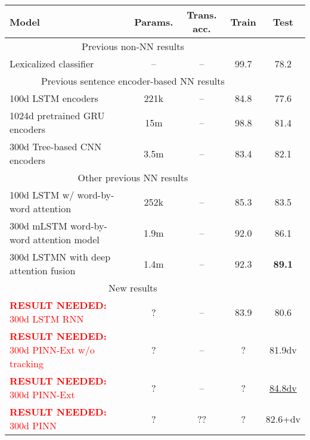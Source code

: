 \documentclass[11pt,letterpaper]{article}
\newcommand\result[1]{\textcolor{red}{\textbf{RESULT NEEDED:} #1}}
\begin{document}
\begin{table*}[t]
  \centering\small
  \begin{tabular}{lcccc} 
    \toprule
Model                   & Params.    & Trans. acc.  &   Train  &   Test \\
\midrule
\multicolumn{4}{c}{Previous non-NN results}\\
\midrule
Lexicalized classifier \cite{snli:emnlp2015}
                        & --                & --                    &   99.7   &   78.2      \\
\midrule
\multicolumn{4}{c}{Previous sentence encoder-based NN results}\\
\midrule
100d LSTM encoders \cite{snli:emnlp2015}
                        & 221k               & --               &   84.8   &   77.6      \\
1024d pretrained GRU encoders \cite{DBLP:journals/corr/VendrovKFU15}
                        & 15m                & --              &   98.8   &   81.4       \\
300d Tree-based CNN encoders \cite{mou2015recognizing}
                        & 3.5m                & --             &   83.4   &   82.1       \\
\midrule
\multicolumn{4}{c}{Other previous NN results}\\
\midrule
100d LSTM w/ word-by-word attention \cite{rocktaschel2015reasoning}
                        & 252k               & --              &   85.3   &   83.5       \\
300d mLSTM word-by-word attention model \cite{DBLP:journals/corr/WangJ15b}
                        & 1.9m               & --             &   92.0   &   86.1      \\
300d LSTMN with deep attention fusion \cite{cheng2016long}
                        & 1.4m               & --                &   92.3   &   \textbf{89.1}      \\
\midrule
\multicolumn{4}{c}{New results}\\
\midrule
\result{300d LSTM RNN      } & ?             & --                &   83.9      &   80.6       \\
\result{300d PINN-Ext w/o tracking}   
                        & ?                  & --                &   ?      &   81.9dv       \\
\result{300d PINN-Ext }
                        & ?                  & --                &   ?      &   \underline{84.8dv}       \\
\result{300d PINN }
                        & ?                  & ??                  &   ?    &   82.6+dv       \\          

\end{tabular}
\end{table*}
\end{document}
